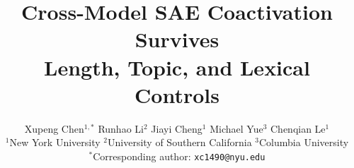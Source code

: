 \documentclass{article}
\title{Cross-Model SAE Coactivation Survives\\Length, Topic, and Lexical Controls}
\author{Xupeng Chen$^{1,*}$ \quad Runhao Li$^{2}$ \quad Jiayi Cheng$^{1}$ \quad Michael Yue$^{3}$ \quad Chenqian Le$^{1}$ \\
{\normalfont $^{1}$New York University \quad $^{2}$University of Southern California \quad $^{3}$Columbia University} \\
{\normalfont $^{*}$Corresponding author: \texttt{xc1490@nyu.edu}}}
\date{}
\begin{document}
\maketitle
{}

\begin{abstract}

\end{abstract}














\appendix


\end{document}
